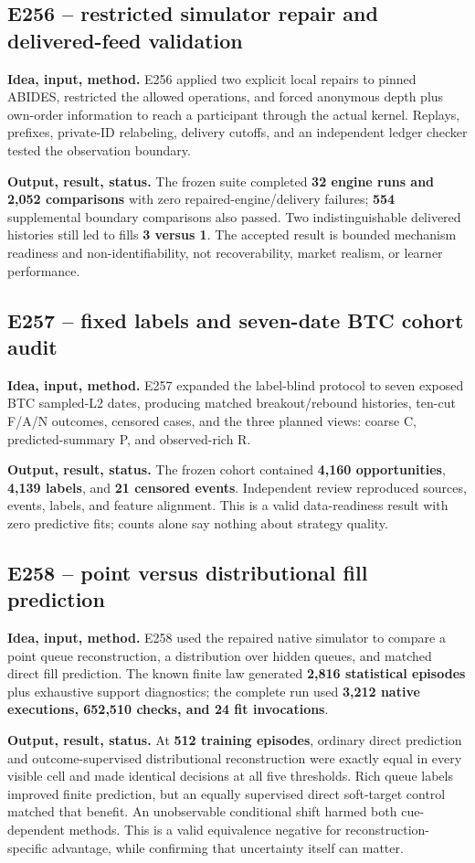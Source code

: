 \documentclass[10pt,a4paper]{article}
\begin{document}
\subsection{E256 -- restricted simulator repair and delivered-feed validation}
\textbf{Idea, input, method.} E256 applied two explicit local repairs to pinned ABIDES, restricted the allowed operations, and forced anonymous depth plus own-order information to reach a participant through the actual kernel. Replays, prefixes, private-ID relabeling, delivery cutoffs, and an independent ledger checker tested the observation boundary.\par
\textbf{Output, result, status.} The frozen suite completed \textbf{32 engine runs and 2,052 comparisons} with zero repaired-engine/delivery failures; \textbf{554} supplemental boundary comparisons also passed. Two indistinguishable delivered histories still led to fills \textbf{3 versus 1}. The accepted result is bounded mechanism readiness and non-identifiability, not recoverability, market realism, or learner performance.\par
\subsection{E257 -- fixed labels and seven-date BTC cohort audit}
\textbf{Idea, input, method.} E257 expanded the label-blind protocol to seven exposed BTC sampled-L2 dates, producing matched breakout/rebound histories, ten-cut F/A/N outcomes, censored cases, and the three planned views: coarse C, predicted-summary P, and observed-rich R.\par
\textbf{Output, result, status.} The frozen cohort contained \textbf{4,160 opportunities}, \textbf{4,139 labels}, and \textbf{21 censored events}. Independent review reproduced sources, events, labels, and feature alignment. This is a valid data-readiness result with zero predictive fits; counts alone say nothing about strategy quality.\par
\subsection{E258 -- point versus distributional fill prediction}
\textbf{Idea, input, method.} E258 used the repaired native simulator to compare a point queue reconstruction, a distribution over hidden queues, and matched direct fill prediction. The known finite law generated \textbf{2,816 statistical episodes} plus exhaustive support diagnostics; the complete run used \textbf{3,212 native executions, 652,510 checks, and 24 fit invocations}.\par
\textbf{Output, result, status.} At \textbf{512 training episodes}, ordinary direct prediction and outcome-supervised distributional reconstruction were exactly equal in every visible cell and made identical decisions at all five thresholds. Rich queue labels improved finite prediction, but an equally supervised direct soft-target control matched that benefit. An unobservable conditional shift harmed both cue-dependent methods. This is a valid equivalence negative for reconstruction-specific advantage, while confirming that uncertainty itself can matter.\par
\end{document}
